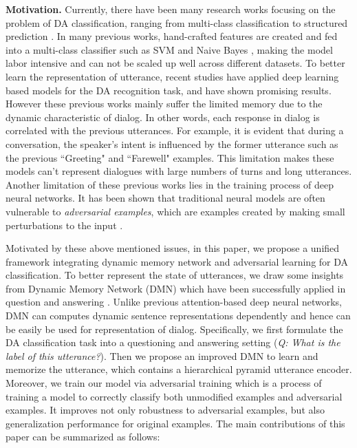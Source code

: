 \documentclass[conference]{IEEEtran}
\begin{document}
	\noindent\textbf{Motivation.} Currently, there have been many research works focusing on the problem of DA classification, ranging from multi-class classification to structured prediction \cite{grau2004dialogue, stolcke2000dialogue}. In many previous works, hand-crafted features are created and fed into a multi-class classifier such as SVM and Naive Bayes \cite{grau2004dialogue,stolcke2000dialogue}, making the model labor intensive and can not be scaled up well across different datasets. 
To better learn the representation of utterance, recent studies \cite{khanpour2016dialogue,ji2016latent} have applied deep learning based models for the DA recognition task, and have shown promising results.
	However these previous works mainly suffer the limited memory due to the dynamic characteristic of dialog. In other words, each response in dialog is correlated with the previous utterances. 
	For example, it is evident that during a conversation, the speaker's intent is influenced by the former utterance such as the previous ``Greeting" and ``Farewell" examples. This limitation makes these models can't represent dialogues with large numbers of turns and long utterances.
	Another limitation of these previous works lies in the training process of deep neural networks. It has been shown that traditional neural models are often vulnerable to \textit{adversarial examples}, which are examples created by making small perturbations to the input \cite{miyato2016adversarial}.
	
	Motivated by these above mentioned issues, in this paper, we propose a unified framework integrating dynamic memory network and adversarial learning for DA classification. To better represent the state of utterances, we draw some insights from Dynamic Memory Network (DMN) which have been successfully applied in question and answering \cite{xiong2016dynamic}. Unlike previous attention-based deep neural networks, DMN can computes dynamic sentence representations dependently and hence can be easily be used for representation of dialog.
	Specifically, we first formulate the DA classification task into a questioning and answering setting (\textit{Q: What is the label of this utterance?}). Then we propose an improved DMN to learn and memorize the utterance, which contains a hierarchical pyramid utterance encoder. 
	Moreover, we train our model via adversarial training which is a process of training a model to correctly classify both unmodified examples and adversarial examples. It improves not only robustness to adversarial examples, but also generalization performance for original examples.
	The main contributions of this paper can be summarized as follows:
	
\end{document}
